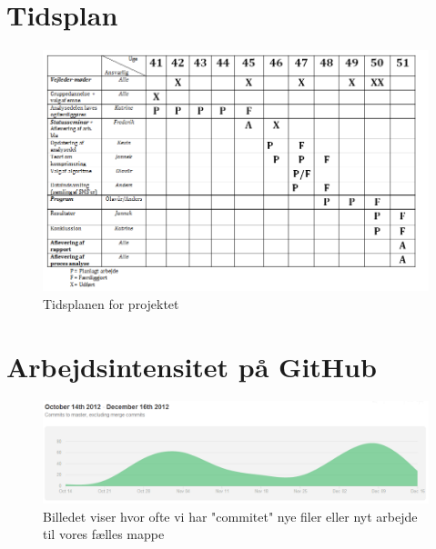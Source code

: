 \section{Tidsplan}
\label{bilag1}
\begin{figure}[H]
\includegraphics[width=\textwidth]{Indhold/tidsplan.png}
\caption {Tidsplanen for projektet}
\label {tidsplan}
\end{figure}

\section{Arbejdsintensitet på GitHub}
\label{bilag2}
\begin{figure}[H]
\includegraphics[width=\textwidth]{Indhold/arbejdsintensitet.png}
\caption {Billedet viser hvor ofte vi har "commitet" nye filer eller nyt arbejde til vores fælles mappe}
\label {arbejde}
\end{figure}
